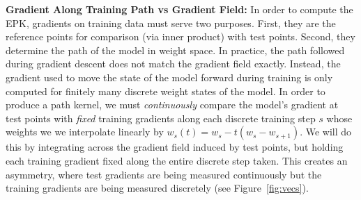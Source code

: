 \textbf{Gradient Along Training Path vs Gradient Field:}
In order to compute the EPK, gradients on training data must serve two purposes. 
First, they are the reference points for comparison (via inner product) with test points. 
Second, they determine the path of the model in weight space. 
In practice, the path followed during gradient descent does not match the gradient field exactly. 
Instead, the gradient used to move the state of the model forward during training is only computed for finitely many discrete weight states of the model.
In order to produce a path kernel, we must \textit{continuously} compare the model's gradient at test points with \textit{fixed} training gradients along each discrete training step $s$ whose weights we we interpolate linearly by $w_s(t) = w_s - t(w_s - w_{s+1})$. We will do this by integrating across the gradient field induced by test points, but holding each training gradient fixed along the entire discrete step taken. This creates an asymmetry, where test gradients are being measured continuously but the training gradients are being measured discretely (see Figure~\ref{fig:vecs}).

